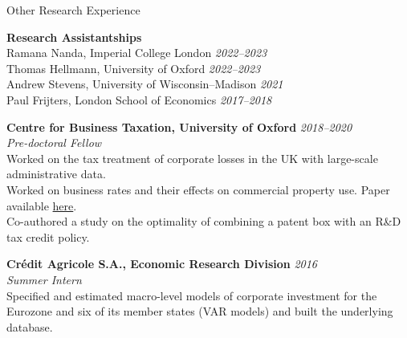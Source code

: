 \documentclass{resume} %
\begin{document}
\begin{rSection}{Other Research Experience}

\textbf{Research Assistantships} \\
Ramana Nanda, Imperial College London \hfill {\em 2022--2023} \\
Thomas Hellmann, University of Oxford \hfill {\em 2022--2023} \\
Andrew Stevens, University of Wisconsin--Madison \hfill {\em 2021} \\
Paul Frijters, London School of Economics \hfill {\em 2017--2018}

{\bf Centre for Business Taxation, University of Oxford} \hfill {\em 2018--2020} \\
\textit{Pre-doctoral Fellow} \\
Worked on the tax treatment of corporate losses in the UK with large-scale administrative data. \\
Worked on business rates and their effects on commercial property use. Paper available \href{https://papers.ssrn.com/sol3/papers.cfm?abstract_id=4352363}{here}. \\
Co-authored a study on the optimality of combining a patent box with an R\&D tax credit policy.



{\bf Cr\'{e}dit Agricole S.A., Economic Research Division} \hfill {\em 2016} \\
\textit{Summer Intern} \\
Specified and estimated macro-level models of corporate investment for the Eurozone and six of its member states (VAR models) and built the underlying database.

\end{rSection}
\end{document}
